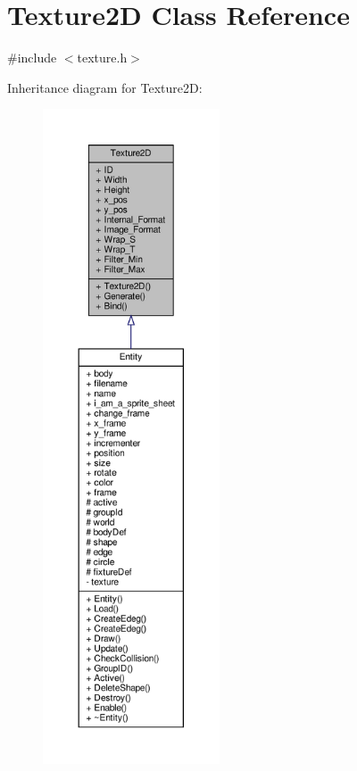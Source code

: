 \hypertarget{classTexture2D}{}\section{Texture2D Class Reference}
\label{classTexture2D}


{\ttfamily \#include $<$texture.\+h$>$}



Inheritance diagram for Texture2D\+:
\nopagebreak
\begin{figure}[H]
\begin{center}
\leavevmode
\includegraphics[height=550pt]{classTexture2D__inherit__graph}
\end{center}
\end{figure}


